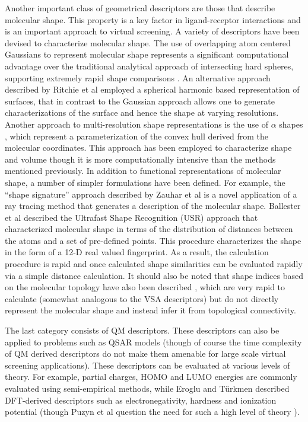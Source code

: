 \documentclass[letterpaper, 12pt]{article}
\begin{document}
Another important class of geometrical descriptors are those that
describe molecular shape. This property is a key factor in ligand-receptor interactions and is
an important approach to virtual screening. A variety of descriptors
have been devised to characterize molecular shape. The use of
overlapping atom centered Gaussians to represent molecular shape
\cite{Grant:1995aa} represents a significant computational advantage
over the traditional analytical approach of intersecting hard spheres,
supporting extremely rapid shape comparisons \cite{Grant:1999vn}. An
alternative approach described by Ritchie et al \cite{Ritchie:1999kx}
employed a spherical harmonic based representation of surfaces, that
in contrast to the Gaussian approach allows one to generate
characterizations of the surface and hence the shape at varying
resolutions. Another approach to multi-resolution shape
representations is the use of $\alpha$ shapes
\cite{Edelsbrunner:1994aa}, which represent a parameterization of the
convex hull derived from the molecular coordinates. This approach has
been employed to characterize shape and volume \cite{Wilson:2009ys}
though it is more computationally intensive than the methods mentioned
previously. In addition to functional representations of molecular
shape, a number of simpler formulations have been defined. For
example, the ``shape signature'' approach described by Zauhar et al
\cite{Zauhar:2003fk} is a novel application of a ray tracing method
that generates a description of the molecular shape. Ballester et al
\cite{Ballester:2007aa} described the Ultrafast Shape Recognition
(USR) approach that characterized molecular shape in terms of the
distribution of distances between the atoms and a set of pre-defined
points. This procedure characterizes the shape in the form of a 12-D
real valued fingerprint. As a result, the calculation procedure is
rapid and once calculated shape similarities can be evaluated rapidly
via a simple distance calculation. It should also be noted that shape
indices based on the molecular topology have also been described
\cite{Kier:1985aa}, which are very rapid to calculate (somewhat
analogous to the VSA descriptors) but do not directly represent the
molecular shape and instead infer it from topological connectivity.

The last category consists of QM descriptors. These
descriptors can also be applied to problems such as QSAR models
(though of course the time complexity of QM derived descriptors do not
make them amenable for large scale virtual screening
applications). These descriptors can be evaluated at various levels of
theory. For example, partial charges, HOMO and LUMO energies are
commonly evaluated using semi-empirical methods, while Eroglu and
T\"{u}rkmen \cite{Eroglu:2007uq} described DFT-derived descriptors
such as electronegativity, hardness and ionization potential (though
Puzyn et al question the need for such a high level of theory
\cite{Puzyn:2008fk}).
\end{document}

